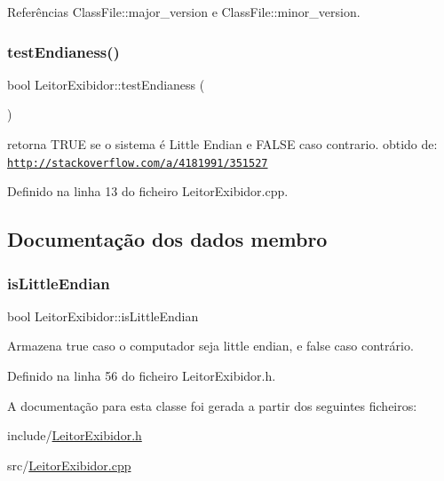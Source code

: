 Referências Class\+File\+::major\+\_\+version e Class\+File\+::minor\+\_\+version.

\mbox{\label{classLeitorExibidor_ac8ff6248b6897d88bb5cf22ea987a6ab}} 
\subsubsection{\texorpdfstring{test\+Endianess()}{testEndianess()}}
{\footnotesize\ttfamily bool Leitor\+Exibidor\+::test\+Endianess (\begin{DoxyParamCaption}{ }\end{DoxyParamCaption})\hspace{0.3cm}{\ttfamily [private]}}

retorna T\+R\+UE se o sistema é Little Endian e F\+A\+L\+SE caso contrario. obtido de\+: \href{http://stackoverflow.com/a/4181991/351527}{\tt http\+://stackoverflow.\+com/a/4181991/351527} 

Definido na linha 13 do ficheiro Leitor\+Exibidor.\+cpp.



\subsection{Documentação dos dados membro}
\mbox{\label{classLeitorExibidor_a25a267e1238c481356a970b17d2fd044}} 
\subsubsection{\texorpdfstring{is\+Little\+Endian}{isLittleEndian}}
{\footnotesize\ttfamily bool Leitor\+Exibidor\+::is\+Little\+Endian\hspace{0.3cm}{\ttfamily [private]}}



Armazena {\ttfamily true} caso o computador seja little endian, e {\ttfamily false} caso contrário. 



Definido na linha 56 do ficheiro Leitor\+Exibidor.\+h.



A documentação para esta classe foi gerada a partir dos seguintes ficheiros\+:\begin{DoxyCompactItemize}
\item 
include/\hyperlink{LeitorExibidor_8h}{Leitor\+Exibidor.\+h}\item 
src/\hyperlink{LeitorExibidor_8cpp}{Leitor\+Exibidor.\+cpp}\end{DoxyCompactItemize}

